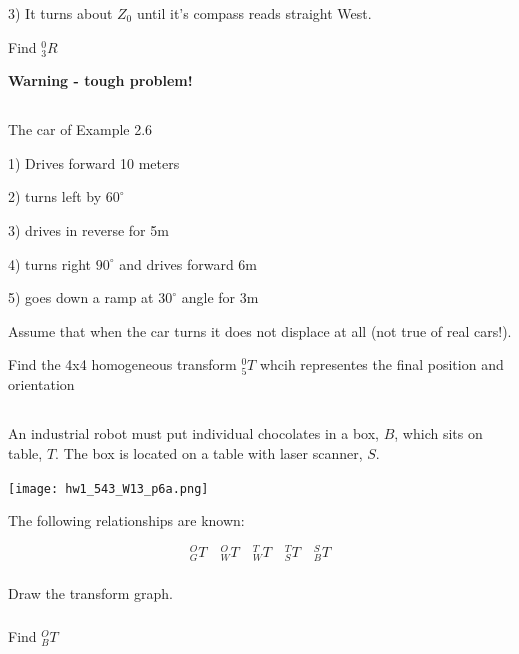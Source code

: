 \documentclass{article}
\begin{document}
3) It turns about $Z_0$ until it's compass reads straight West.


Find $^0_3R$

{\bf Warning - tough problem!}

\subsection{}
The car of Example 2.6

1) Drives forward 10 meters

2) turns left by $60^\circ$

3) drives in reverse for 5m

4) turns right $90^\circ$ and drives forward 6m

5) goes down a ramp at $30^\circ$ angle for 3m

Assume that when the car turns it does not displace at all (not true of real cars!).

Find the 4x4 homogeneous transform $^0_5T$ whcih representes the final position and orientation

\newpage
\subsection{}
An industrial robot must put individual chocolates in a box, $B$, which sits on table, $T$.   The box is located on a table with laser scanner, $S$. 

\texttt{[image: hw1\_543\_W13\_p6a.png]}

The following relationships are known:

\[
{^O_GT}\quad{^O_WT}\quad{^T_WT}\quad{^T_ST}\quad{^S_BT}
\]

\subsubsection{}
Draw the transform graph.

\subsubsection{}
Find ${^O_BT}$
\end{document}
